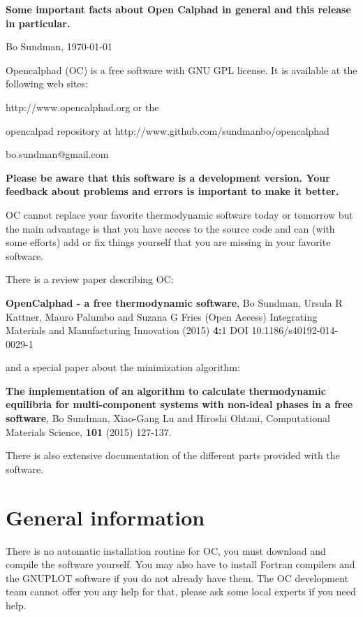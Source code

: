 \documentclass[12pt]{article}
\begin{document}
\begin{center}
{\Large \bf Some important facts about Open Calphad in general and
  this release in particular.

}

Bo Sundman, \today

Opencalphad (OC) is a free software with GNU GPL license.  It is
available at the following web sites:

http://www.opencalphad.org or the

opencalpad repository at http://www.github.com/sundmanbo/opencalphad

bo.sundman@gmail.com
\end{center}

{\large \bf Please be aware that this software is a development
  version.  Your feedback about problems and errors is important to
  make it better.

}

OC cannot replace your favorite thermodynamic software today or
tomorrow but the main advantage is that you have access to the source
code and can (with some efforts) add or fix things yourself that you
are missing in your favorite software.

There is a review paper describing OC:

{\bf OpenCalphad - a free thermodynamic software}, Bo Sundman, Ursula
R Kattner, Mauro Palumbo and Suzana G Fries (Open Access) Integrating
Materials and Manufacturing Innovation (2015) {\bf 4:}1 DOI
10.1186/s40192-014-0029-1

and a special paper about the minimization algorithm:

{\bf The implementation of an algorithm to calculate thermodynamic
  equilibria for multi-component systems with non-ideal phases in a
  free software}, Bo Sundman, Xiao-Gang Lu and Hiroshi Ohtani,
Computational Materials Science, {\bf 101} (2015) 127-137.

There is also extensive documentation of the different parts provided
with the software.

\section{General information}

There is no automatic installation routine for OC, you must download
and compile the software yourself.  You may also have to install
Fortran compilers and the GNUPLOT software if you do not already have
them.  The OC development team cannot offer you any help for that,
please ask some local experts if you need help.
\end{document}
